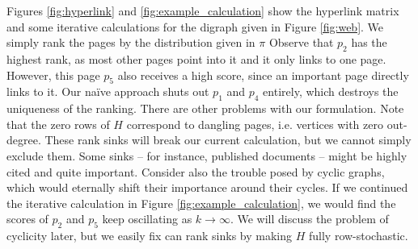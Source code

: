\documentclass[../exploring-pagerank.tex]{subfiles}
\begin{document}
    Figures \ref{fig:hyperlink} and \ref{fig:example_calculation} show the hyperlink matrix and some iterative calculations for the digraph given in Figure \ref{fig:web}. We simply rank the pages by the distribution given in $\pi$ Observe that $p_2$ has the highest rank, as most other pages point into it and it only links to one page. However, this page $p_5$ also receives a high score, since an important page directly links to it. Our na{\"i}ve approach shuts out $p_1$ and $p_4$ entirely, which destroys the uniqueness of the ranking. There are other problems with our formulation. Note that the zero rows of $H$ correspond to dangling pages, i.e. vertices with zero out-degree. These rank sinks will break our current calculation, but we cannot simply exclude them. Some sinks -- for instance, published documents -- might be highly cited and quite important. Consider also the trouble posed by cyclic graphs, which would eternally shift their importance around their cycles. If we continued the iterative calculation in Figure \ref{fig:example_calculation}, we would find the scores of $p_2$ and $p_5$ keep oscillating as $k\to\infty$. We will discuss the problem of cyclicity later, but we easily fix can rank sinks by making $H$ fully row-stochastic.
\end{document}
